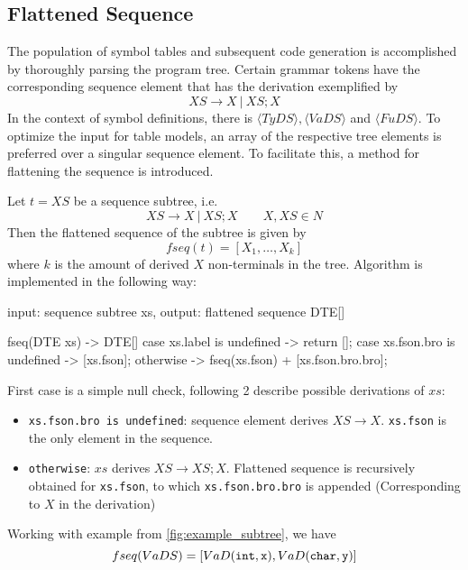 \subsection{Flattened Sequence}\label{subsec:$fseq$}
The population of symbol tables and subsequent code generation is accomplished by thoroughly parsing the program tree.
Certain grammar tokens have the corresponding sequence element that has the derivation exemplified by
\[XS \to X\ |\ XS; X\]
In the context of symbol definitions, there is $\langle TyDS\rangle, \langle VaDS \rangle$ and $\langle FuDS \rangle$.
To optimize the input for table models, an array of the respective tree elements is preferred over a singular sequence element.
To facilitate this, a method for flattening the sequence is introduced.
\newpage
\begin{definition}[fseq]
    Let $t = XS$ be a sequence subtree, i.e.
    \[XS \to X \ |\ XS;X\qquad X,XS\in N\]
    Then the flattened sequence of the subtree is given by
    \[fseq(t) = \left[X_1,\dots,X_k\right]\]
    where $k$ is the amount of derived $X$ non-terminals in the tree.
    Algorithm is implemented in the following way:
\end{definition}

\begin{codeblock}
    input: sequence subtree xs,
    output: flattened sequence DTE[]

    fseq(DTE xs) -> DTE[] {
        case xs.label is undefined -> return [];
        case xs.fson.bro is undefined -> [xs.fson];
        otherwise -> fseq(xs.fson) + [xs.fson.bro.bro];
    }
\end{codeblock}
First case is a simple null check, following 2 describe
possible derivations of $xs$:
\begin{itemize}
    \item \verb+xs.fson.bro is undefined+: sequence element derives $XS \to X$. \verb+xs.fson+ is the only
    element in the sequence.
    \item \verb+otherwise+: $xs$ derives $XS \to XS;X$.
    Flattened sequence is recursively obtained for \verb+xs.fson+, to which \verb+xs.fson.bro.bro+ is appended
    (Corresponding to $X$ in the derivation)
\end{itemize}
Working with example from \ref{fig:example_subtree}, we have
\[fseq(VaDS) = [VaD(\verb+int+, \verb+x+), VaD(\verb+char+, \verb+y+)]\]


